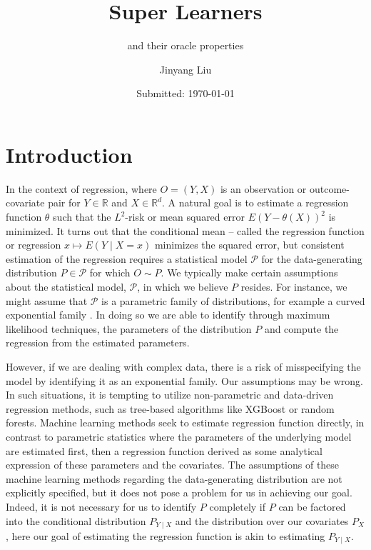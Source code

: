 \documentclass[11pt, a4paper]{article}
\author{Jinyang Liu}
\title{Super Learners}
\subtitle{and their oracle properties}
\date{Submitted: \today}
\theoremstyle{definition}
\theoremstyle{remark}
\begin{document}
\begingroup
    \selectfont
    \maketitle
    \tableofcontents
    \newpage
\endgroup


\section{Introduction}
In the context of regression, where $ O = (Y, X) $ is an observation or outcome-covariate pair for $ Y \in \mathbb{R} $ and $ X \in \mathbb{R}^{d} $. A natural goal is to estimate a regression function $ \theta $ such that the $ L^2 $-risk or mean squared error $ E(Y - \theta(X))^2 $ is minimized. It turns out that the conditional mean -- called the regression function or regression $ x \mapsto E(Y \mid X = x) $ minimizes the squared error, but consistent estimation of the regression requires a statistical model $ \mathcal{P} $ for the data-generating distribution $ P \in \mathcal{P} $ for which $ O \sim P $. We typically make certain assumptions about the statistical model, $\mathcal{P}$, in which we believe $P$ resides. For instance, we might assume that $\mathcal{P}$ is a parametric family of distributions, for example a curved exponential family \parencite{lauritzen2022statistics}. In doing so we are able to identify through maximum likelihood techniques, the parameters of the distribution $ P $ and compute the regression from the estimated parameters.

However, if we are dealing with complex data, there is a risk of misspecifying the model by identifying it as an exponential family. Our assumptions may be wrong. In such situations, it is tempting to utilize non-parametric and data-driven regression methods, such as tree-based algorithms like XGBoost or random forests. Machine learning methods seek to estimate regression function directly, in contrast to parametric statistics where the parameters of the underlying model are estimated first, then a regression function derived as some analytical expression of these parameters and the covariates. The assumptions of these machine learning methods regarding the data-generating distribution are not explicitly specified, but it does not pose a problem for us in achieving our goal. Indeed, it is not necessary for us to identify $ P $ completely if $ P $ can be factored into the conditional distribution $ P_{Y \mid X} $ and the distribution over our covariates $ P_X $, here our goal of estimating the regression function is akin to estimating $ P_{Y \mid X} $.   
\end{document}
